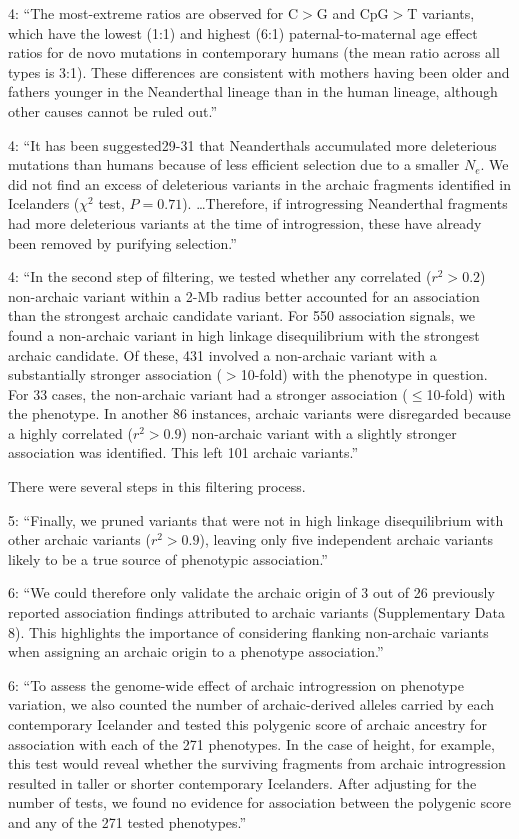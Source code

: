 \documentclass{article}
\begin{document}
4: ``The most-extreme ratios are observed for C$>$G and CpG$>$T
variants, which have the lowest (1:1) and highest (6:1)
paternal-to-maternal age effect ratios for de novo mutations in
contemporary humans (the mean ratio across all types is 3:1).  These
differences are consistent with mothers having been older and fathers
younger in the Neanderthal lineage than in the human lineage, although
other causes cannot be ruled out.''

4: ``It has been suggested29-31 that Neanderthals accumulated more
deleterious mutations than humans because of less efficient selection
due to a smaller $N_e$. We did not find an excess of deleterious
variants in the archaic fragments identified in Icelanders ($\chi^2$
test, $P=0.71$). \ldots Therefore, if introgressing Neanderthal
fragments had more deleterious variants at the time of introgression,
these have already been removed by purifying selection.''

4: ``In the second step of filtering, we tested whether any correlated
($r^2 > 0.2$) non-archaic variant within a 2-Mb radius better
accounted for an association than the strongest archaic candidate
variant. For 550 association signals, we found a non-archaic variant
in high linkage disequilibrium with the strongest archaic
candidate. Of these, 431 involved a non-archaic variant with a
substantially stronger association ($>$10-fold) with the phenotype in
question. For 33 cases, the non-archaic variant had a stronger
association ($\leq$10-fold) with the phenotype. In another 86
instances, archaic variants were disregarded because a highly
correlated ($r^2 > 0.9$) non-archaic variant with a slightly stronger
association was identified. This left 101 archaic variants.''

There were several steps in this filtering process.

5: ``Finally, we pruned variants that were not in high linkage
disequilibrium with other archaic variants ($r^2 > 0.9$), leaving only
five independent archaic variants likely to be a true source of
phenotypic association.''

6: ``We could therefore only validate the archaic origin of 3 out of
26 previously reported association findings attributed to archaic
variants (Supplementary Data 8). This highlights the importance of
considering flanking non-archaic variants when assigning an archaic
origin to a phenotype association.''

6: ``To assess the genome-wide effect of archaic introgression on
phenotype variation, we also counted the number of archaic-derived
alleles carried by each contemporary Icelander and tested this
polygenic score of archaic ancestry for association with each of the
271 phenotypes. In the case of height, for example, this test would
reveal whether the surviving fragments from archaic introgression
resulted in taller or shorter contemporary Icelanders. After adjusting
for the number of tests, we found no evidence for association between
the polygenic score and any of the 271 tested phenotypes.''
\end{document}
